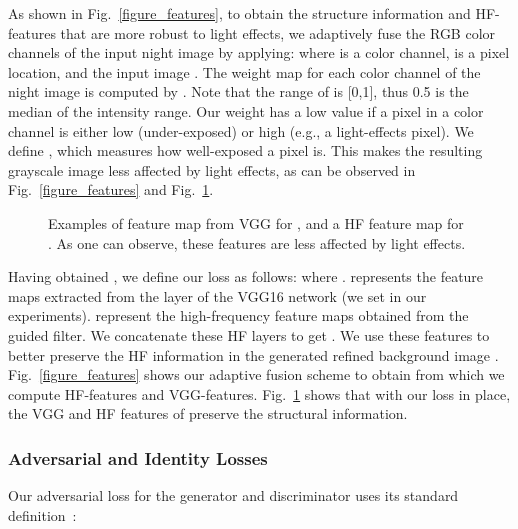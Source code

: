 \documentclass[runningheads]{llncs}
\begin{document}
As shown in Fig.~\ref{figure_features}, to obtain the structure information and HF-features that are more robust to light effects, we adaptively fuse the RGB color channels of the input night image by applying:  where  is a color channel,  is a pixel location, and the input image .
The weight map for each color channel of the night image  is computed by . Note that the range of  is [0,1], thus 0.5 is the median of the intensity range. 
Our weight has a low value if a pixel in a color channel is either low (under-exposed) or high (e.g., a light-effects pixel).
We define , which measures how well-exposed a pixel is.
This makes the resulting grayscale image  less affected by light effects, as can be observed in Fig.~\ref{figure_features} and Fig.~\ref{figure_vgg_features}.

\begin{figure}[t!]
	\captionsetup[subfloat]{labelformat=empty}
	\captionsetup[subfloat]{farskip=1pt}
	\centering
	\hfill
	\hfill
	\hfill
	\hfill
	\hfill
	\caption{Examples of feature map from VGG for , and a HF feature map for . As one can observe, these features are less affected by light effects.}
	\label{figure_vgg_features}
\end{figure}

Having obtained , we define our loss as follows:
where . 
 represents the feature maps extracted from the  layer of the VGG16 network (we set  in our experiments).
 represent the high-frequency feature maps obtained from the guided filter. 
We concatenate these HF layers to get . 
We use these features to better preserve the HF information in the generated refined background image .
Fig.~\ref{figure_features} shows our adaptive fusion scheme to obtain  from which we compute HF-features and VGG-features.  
Fig.~\ref{figure_vgg_features} shows that with our loss in place, the VGG and HF features of  preserve the structural information.


\subsubsection{Adversarial and Identity Losses}
Our adversarial loss for the generator and discriminator  uses its standard definition~\cite{goodfellow2014generative,mao2017least}:
\end{document}

